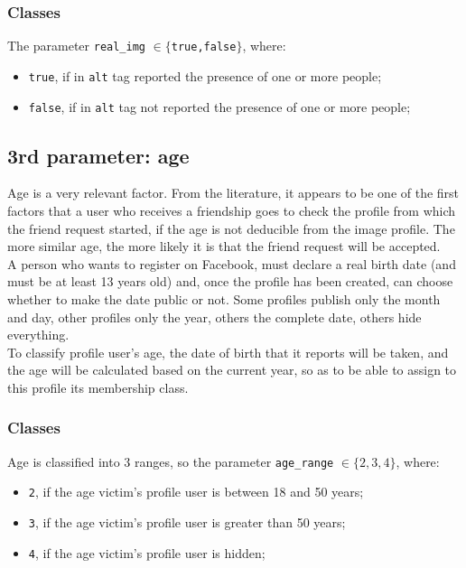 \subsubsection*{Classes}
The parameter \texttt{real\_img} $ \in \{$\texttt{true,false}$\}$, where: 
\begin{itemize}
	\item \texttt{true}, if in \texttt{alt} tag reported the presence of one or more people;
	\item \texttt{false}, if in \texttt{alt} tag not reported the presence of one or more people;
\end{itemize}
\subsection{3rd parameter: age} 
\label{cap:age-parameter}
Age is a very relevant factor. From the literature, it appears to be one of the first factors that a user who receives a friendship goes to check the profile from which the friend request started, if the age is not deducible from the image profile. 
The more similar age, the more likely it is that the friend request will be accepted.\\
A person who wants to register on Facebook, must declare a real birth date (and must be at least 13 years old) and, once the profile has been created, can choose whether to make the date public or not. Some profiles publish only the month and day, other profiles only the year, others the complete date, others hide everything.\\To classify profile user's age, the date of birth that it reports will be taken, and the age will be calculated based on the current year, so as to be able to assign to this profile its membership class.
\subsubsection*{Classes}
Age is classified into 3 ranges, so the parameter \texttt{age\_range} $ \in \{2,3,4\}$, where: 
\begin{itemize}
	\item \texttt{2}, if the age victim's profile user is between 18 and 50 years;
	\item \texttt{3}, if the age victim's profile user is greater than 50 years;
	\item \texttt{4}, if the age victim's profile user is hidden;
\end{itemize}

